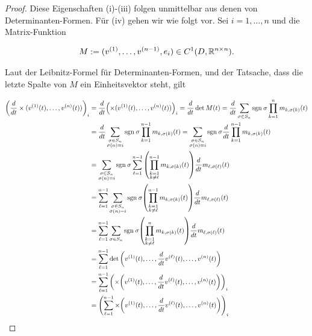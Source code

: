 \begin{proof}

Diese Eigenschaften (i)-(iii) folgen unmittelbar aus denen von Determinanten-Formen.
Für (iv) gehen wir wie folgt vor.
Sei $i = 1, \ldots, n$ und die Matrix-Funktion

\begin{align*}
  M := (v^{(1)}, \ldots, v^{(n-1)}, e_i)
  \in C^1(D, \mathbb{R}^{n \times n}).
\end{align*}

Laut der Leibnitz-Formel für Determinanten-Formen, und der Tatsache, dass die letzte Spalte von $M$ ein Einheitsvektor steht, gilt

\begin{align*}
  {\left ( 
    \frac{d}{dt}
    \times(v^{(1)}(t), \ldots, v^{(n)}(t))
   \right )}_i
  & =
  \frac{d}{dt}
  {\left ( 
    \times(v^{(1)}(t), \ldots, v^{(n)}(t))
   \right )}_i
  =
  \frac{d}{dt}
  \det{M(t)}
  =
  \frac{d}{dt}
  \sum_{\sigma \in S_n}
  \mathrm{sgn} \: \sigma
  \prod_{k=1}^n
  m_{k, \sigma(k)}(t) \\
  & =
  \frac{d}{dt}
  \sum_{\substack{\sigma \in S_n \\ \sigma(n) = i}}
  \mathrm{sgn} \: \sigma
  \prod_{k=1}^{n-1}
  m_{k, \sigma(k)}(t)
  =
  \sum_{\substack{\sigma \in S_n \\ \sigma(n) = i}}
  \mathrm{sgn} \: \sigma
  \frac{d}{dt}
  \prod_{k=1}^{n-1}
  m_{k, \sigma(k)}(t) \\
  & =
  \sum_{\substack{\sigma \in S_n \\ \sigma(n) = i}}
  \mathrm{sgn} \: \sigma
  \sum_{\ell = 1}^{n-1}
  {\left ( 
    \prod_{\substack{k=1 \\ k \neq \ell}}^{n-1}
    m_{k, \sigma(k)}(t)
   \right )}
  \frac{d}{dt}
  m_{\ell, \sigma(\ell)}(t) \\
  & =
  \sum_{\ell = 1}^{n-1}
  \sum_{\substack{\sigma \in S_n \\ \sigma(n) = i}}
  \mathrm{sgn} \: \sigma
  {\left ( 
    \prod_{\substack{k=1 \\ k \neq \ell}}^{n-1}
    m_{k, \sigma(k)}(t)
   \right )}
  \frac{d}{dt}
  m_{\ell, \sigma(\ell)}(t) \\
  & =
  \sum_{\ell = 1}^{n-1}
  \sum_{\sigma \in S_n}
  \mathrm{sgn} \: \sigma
  {\left ( 
    \prod_{\substack{k=1 \\ k \neq \ell}}^n
    m_{k, \sigma(k)}(t)
   \right )}
  \frac{d}{dt}
  m_{\ell, \sigma(\ell)}(t) \\
  & =
  \sum_{\ell = 1}^{n-1}
  \det {\left ( 
    v^{(1)}(t),
    \ldots,
    \frac{d}{dt}
    v^{(\ell)}(t),
    \ldots,
    v^{(n)}(t)
   \right )} \\
  & =
  \sum_{\ell = 1}^{n-1}
  {\left ( 
    \times {\left ( 
    v^{(1)}(t),
    \ldots,
    \frac{d}{dt}
    v^{(\ell)}(t),
    \ldots,
    v^{(n)}(t)
     \right )}
   \right )}_i \\
  & =
  {\left ( 
    \sum_{\ell = 1}^{n-1}
    \times {\left ( 
    v^{(1)}(t),
    \ldots,
    \frac{d}{dt}
    v^{(\ell)}(t),
    \ldots,
    v^{(n)}(t)
     \right )}
   \right )}_i
\end{align*}

\end{proof}
